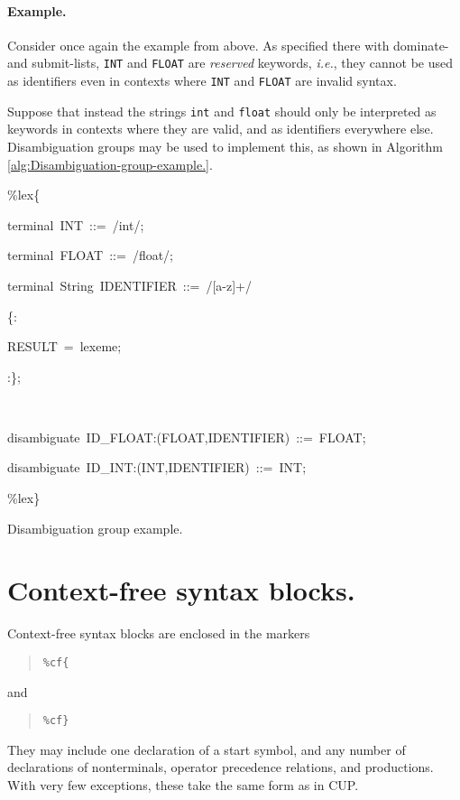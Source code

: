 \documentclass[12pt,english,twoside]{report}
\newenvironment{codeblock}
{\begin{list}{}{
\setlength{\rightmargin}{\leftmargin}
\setlength{\listparindent}{0pt}%
\raggedright
\setlength{\itemsep}{0pt}
\setlength{\parsep}{0pt}
\normalfont\ttfamily}%
 \item[]}
{\end{list}}
\begin{document}
\paragraph{Example.}

Consider once again the example from above. As specified there with
dominate- and submit-lists, \texttt{INT} and \texttt{FLOAT} are \emph{reserved}
keywords, \emph{i.e.}, they cannot be used as identifiers even in
contexts where \texttt{INT} and \texttt{FLOAT} are invalid syntax.

Suppose that instead the strings \texttt{int} and \texttt{float} should
only be interpreted as keywords in contexts where they are valid,
and as identifiers everywhere else. Disambiguation groups may be used
to implement this, as shown in Algorithm \ref{alg:Disambiguation-group-example.}.

%
\begin{algorithm}
\begin{codeblock}
\%lex\{
\begin{codeblock}
terminal~INT~::=~/int/;

terminal~FLOAT~::=~/float/;

terminal~String~IDENTIFIER~::=~/{[}a-z]+/

\{:
\begin{codeblock}
RESULT~=~lexeme;
\end{codeblock}
:\};

~

disambiguate~ID\_FLOAT:(FLOAT,IDENTIFIER)~::=~FLOAT;

disambiguate~ID\_INT:(INT,IDENTIFIER)~::=~INT;
\end{codeblock}
\%lex\}
\end{codeblock}

\caption{\label{alg:Disambiguation-group-example.}Disambiguation group example.}
\end{algorithm}



\section{Context-free syntax blocks.}

Context-free syntax blocks are enclosed in the markers

\begin{quote}
\texttt{\%cf\{}
\end{quote}
and

\begin{quote}
\texttt{\%cf\}}
\end{quote}
They may include one declaration of a start symbol, and any number
of declarations of nonterminals, operator precedence relations, and
productions. With very few exceptions, these take the same form as
in CUP.
\end{document}
